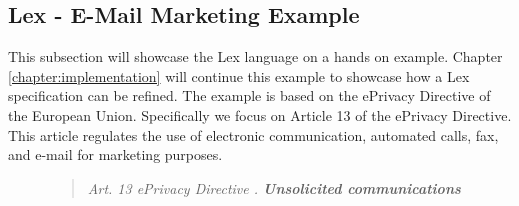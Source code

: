\subsection{Lex - E-Mail Marketing Example}
\label{subsection:lex-email-marketing-example}

This subsection will showcase the Lex language
on a hands on example.
Chapter \ref{chapter:implementation} will continue
this example to showcase how a Lex specification
can be refined.
The example is based on the ePrivacy Directive
of the European Union. %
Specifically we focus on Article 13 of the ePrivacy Directive.
This article regulates the use of electronic communication,
automated calls, fax, and e-mail for marketing purposes.

\begin{figure}
    \begin{minipage}{\columnwidth}
    \begin{quote}
        \small \itshape
        Art. 13 ePrivacy Directive . \textbf{Unsolicited communications}


\end{quote}
\end{minipage}
\end{figure}
